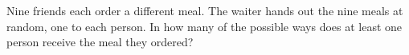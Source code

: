 Nine friends each order a different meal. The waiter hands out the nine meals at random, one to each person. In how many of the possible ways does at least one person receive the meal they ordered?
